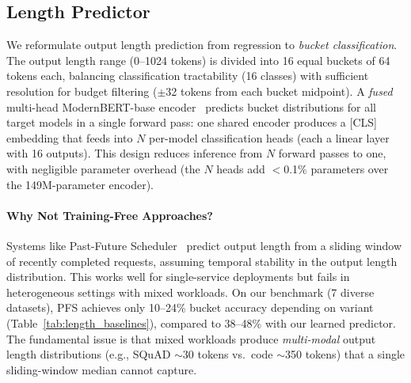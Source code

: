 \documentclass[letterpaper, anonymous, twocolumn, 10pt]{article}
\begin{document}
\subsection{Length Predictor} \label{section:length_predictor}

We reformulate output length prediction from regression to \emph{bucket classification}. The output length range (0--1024 tokens) is divided into 16 equal buckets of 64 tokens each, balancing classification tractability (16 classes) with sufficient resolution for budget filtering ($\pm$32 tokens from each bucket midpoint). A \emph{fused} multi-head ModernBERT-base encoder~\cite{modernbert} predicts bucket distributions for all target models in a single forward pass: one shared encoder produces a [CLS] embedding that feeds into $N$ per-model classification heads (each a linear layer with 16 outputs). This design reduces inference from $N$ forward passes to one, with negligible parameter overhead (the $N$ heads add $<$0.1\% parameters over the 149M-parameter encoder).

\paragraph{Why Not Training-Free Approaches?}
Systems like Past-Future Scheduler~\cite{Gong_2025} predict output length from a sliding window of recently completed requests, assuming temporal stability in the output length distribution. This works well for single-service deployments but fails in heterogeneous settings with mixed workloads. On our benchmark (7 diverse datasets), PFS achieves only 10--24\% bucket accuracy depending on variant (Table~\ref{tab:length_baselines}), compared to 38--48\% with our learned predictor. The fundamental issue is that mixed workloads produce \emph{multi-modal} output length distributions (e.g., SQuAD $\sim$30 tokens vs.\ code $\sim$350 tokens) that a single sliding-window median cannot capture.
\end{document}

